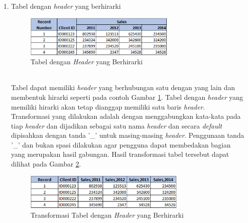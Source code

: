 \begin{enumerate}
	\item Tabel dengan \textit{header} yang berhirarki
	\begin{figure}[htbp]
	    \centering
	    \includegraphics[width=0.7\textwidth]{resources/chapter-3-tabletype-3.png}
	    \caption{Tabel dengan \textit{Header} yang Berhirarki}
		\label{TabelTipe3}
	\end{figure}\\
	Tabel dapat memiliki \textit{header} yang berhubungan satu dengan yang lain dan membentuk hirarki seperti pada contoh Gambar \ref{TabelTipe3}. Tabel dengan \textit{header} yang memiliki hirarki akan tetap dianggap memiliki satu baris \textit{header}. Transformasi yang dilakukan adalah dengan menggabungkan kata-kata pada tiap \textit{header} dan dijadikan sebagai satu nama \textit{header} dan secara \textit{default} dipisahkan dengan tanda '\_' untuk masing-masing \textit{header}. Penggunaan tanda '\_' dan bukan spasi dilakukan agar pengguna dapat membedakan bagian yang merupakan hasil gabungan. Hasil transformasi tabel tersebut dapat dilihat pada Gambar \ref{TabelTipe3T}.\\
	\begin{figure}[htbp]
	    \centering
	    \includegraphics[width=0.75\textwidth]{resources/chapter-3-tabletype-3-transformed.png}
	    \caption{Transformasi Tabel dengan \textit{Header} yang Berhirarki}
		\label{TabelTipe3T}
	\end{figure}


\end{enumerate}
